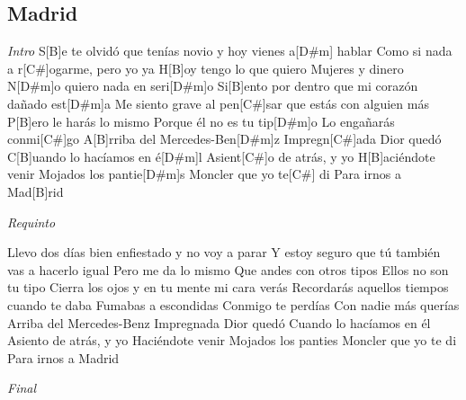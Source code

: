 \subsection{Madrid}
\noindent

\vspace{1cm}

\begin{guitar}
	\begin{multicols}{2}
		\textit{Intro}
		S[B]e te olvidó que tenías novio y hoy vienes a[D#m] hablar
		Como si nada a r[C#]ogarme, pero yo ya
		H[B]oy tengo lo que quiero
	Mujeres y dinero
	N[D#m]o quiero nada en seri[D#m]o
	Si[B]ento por dentro que mi corazón dañado est[D#m]a
	Me siento grave al pen[C#]sar que estás con alguien más
	P[B]ero le harás lo mismo
	Porque él no es tu tip[D#m]o
	Lo engañarás conmi[C#]go
	A[B]rriba del Mercedes-Ben[D#m]z
	Impregn[C#]ada Dior quedó
	C[B]uando lo hacíamos en é[D#m]l
	Asient[C#]o de atrás, y yo
	H[B]aciéndote venir
	Mojados los pantie[D#m]s
	Moncler que yo te[C#] di
	Para irnos a Mad[B]rid
	\par
	\textit{Requinto}
	\par
	Llevo dos días bien enfiestado y no voy a parar
	Y estoy seguro que tú también vas a hacerlo igual
	Pero me da lo mismo
	Que andes con otros tipos
	Ellos no son tu tipo
	Cierra los ojos y en tu mente mi cara verás
	Recordarás aquellos tiempos cuando te daba
	Fumabas a escondidas
	Conmigo te perdías
	Con nadie más querías
	Arriba del Mercedes-Benz
	Impregnada Dior quedó
	Cuando lo hacíamos en él
	Asiento de atrás, y yo
	Haciéndote venir
	Mojados los panties
	Moncler que yo te di
	Para irnos a Madrid
	\par
		\textit{Final}
	\end{multicols}
\end{guitar}
